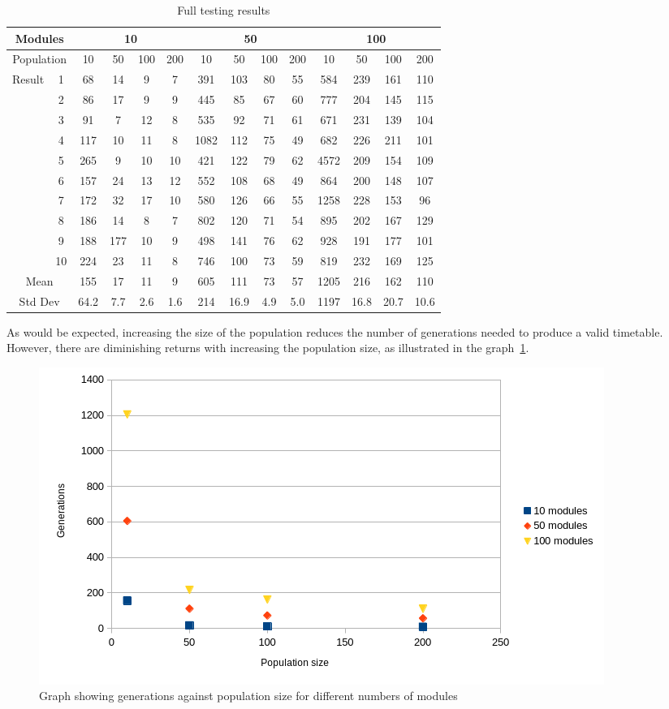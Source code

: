 \begin{table}[ht]
	\begin{tabular}{cc|cccc|cccc|cccc}
		\toprule
		\multicolumn{2}{c}{Modules}
			& \multicolumn{4}{c}{10}
			& \multicolumn{4}{c}{50}
			& \multicolumn{4}{c}{100} \\
		\midrule
		\multicolumn{2}{c}{Population}
			& 10 & 50 & 100 & 200 
			& 10 & 50 & 100 & 200 
			& 10 & 50 & 100 & 200 \\
		\midrule
		Result & 1
			& 68 & 14 & 9 & 7
			& 391 & 103 & 80 & 55
			& 584 & 239 & 161 & 110 \\
		& 2
			& 86 & 17 & 9 & 9
			& 445 & 85 & 67 & 60
			& 777 & 204 & 145 & 115 \\
		& 3
			& 91 & 7 & 12 & 8
			& 535 & 92 & 71 & 61
			& 671 & 231 & 139 & 104 \\
		& 4
			& 117 & 10 & 11 & 8
			& 1082 & 112 & 75 & 49
			& 682 & 226 & 211 & 101 \\
		& 5
			& 265 & 9 & 10 & 10
			& 421 & 122 & 79 & 62
			& 4572 & 209 & 154 & 109 \\
		& 6
			& 157 & 24 & 13 & 12
			& 552 & 108 & 68 & 49
			& 864 & 200 & 148 & 107 \\
		& 7
			& 172 & 32 & 17 & 10
			& 580 & 126 & 66 & 55
			& 1258 & 228 & 153 & 96 \\
		& 8
			& 186 & 14 & 8 & 7
			& 802 & 120 & 71 & 54
			& 895 & 202 & 167 & 129 \\
		& 9
			& 188 & 177 & 10 & 9
			& 498 & 141 & 76 & 62
			& 928 & 191 & 177 & 101 \\
		& 10
			& 224 & 23 & 11 & 8
			& 746 & 100 & 73 & 59
			& 819 & 232 & 169 & 125 \\
		\midrule
		\multicolumn{2}{c}{Mean}
			& 155 & 17 & 11 & 9
			& 605 & 111 & 73 & 57
			& 1205 & 216 & 162 & 110 \\
		\multicolumn{2}{c}{Std Dev}
			& 64.2 & 7.7 & 2.6 & 1.6
			& 214 & 16.9 & 4.9 & 5.0
			& 1197 & 16.8 & 20.7 & 10.6 \\
		\bottomrule
	\end{tabular}
	\caption{Full testing results}
	\label{table:results-full}
\end{table}

As would be expected, increasing the size of the population reduces the number
of generations needed to produce a valid timetable.
However, there are diminishing returns with increasing the population size, as
illustrated in the graph~\ref*{fig:graph-1}.

\begin{figure}[ht]
	\centering
	\includegraphics[scale=0.6]{images/graph-1.png}
	\caption{Graph showing generations against population size for different 
		numbers of modules}
	\label{fig:graph-1}
\end{figure}